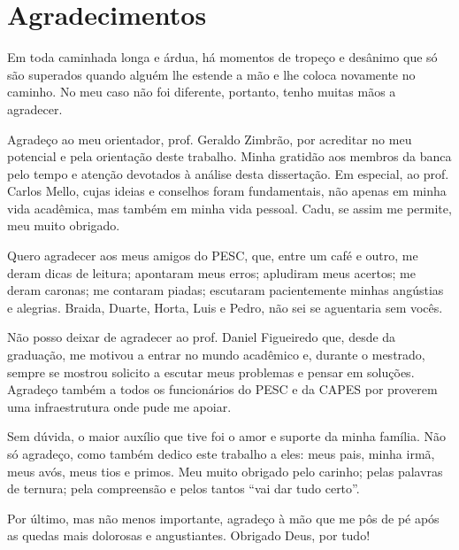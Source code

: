 \chapter*{Agradecimentos}

Em toda caminhada longa e árdua, há momentos de tropeço e desânimo que só são superados quando alguém lhe estende a mão e lhe coloca novamente no caminho. No meu caso não foi diferente, portanto, tenho muitas mãos a agradecer.

Agradeço ao meu orientador, prof. Geraldo Zimbrão, por acreditar no meu potencial e pela orientação deste trabalho. Minha gratidão aos membros da banca pelo tempo e atenção devotados à análise desta dissertação. Em especial, ao prof. Carlos Mello, cujas ideias e conselhos foram fundamentais, não apenas em minha vida acadêmica, mas também em minha vida pessoal. Cadu, se assim me permite, meu muito obrigado.

Quero agradecer aos meus amigos do PESC, que, entre um café e outro, me deram dicas de leitura; apontaram meus erros; apludiram meus acertos; me deram caronas; me contaram piadas; escutaram pacientemente minhas angústias e alegrias. Braida, Duarte, Horta, Luis e Pedro, não sei se aguentaria sem vocês.

Não posso deixar de agradecer ao prof. Daniel Figueiredo que, desde da graduação, me motivou a entrar no mundo acadêmico e, durante o mestrado, sempre se mostrou solicito a escutar meus problemas e pensar em soluções. Agradeço também a todos os funcionários do PESC e da CAPES por proverem uma infraestrutura onde pude me apoiar.

Sem dúvida, o maior auxílio que tive foi o amor e suporte da minha família. Não só agradeço, como também dedico este trabalho a eles: meus pais, minha irmã, meus avós, meus tios e primos. Meu muito obrigado pelo carinho; pelas palavras de ternura; pela compreensão e pelos tantos ``vai dar tudo certo''.

Por último, mas não menos importante, agradeço à mão que me pôs de pé após as quedas mais dolorosas e angustiantes. Obrigado Deus, por tudo!